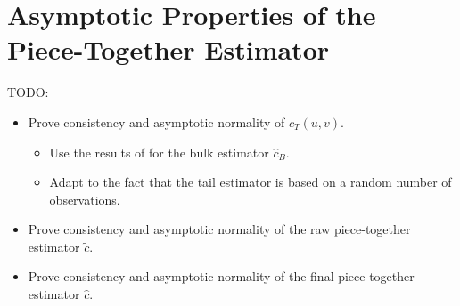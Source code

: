 \documentclass[12pt, headinclude=true]{scrartcl}
\begin{document}
\section{Asymptotic
Properties of the Piece-Together Estimator}
TODO:
\begin{itemize}
  \item Prove consistency and asymptotic normality of $\hat c_T(u,v)$.
    \begin{itemize}
      \item Use the results of \citet{geenens2017probit} for the bulk estimator $\hat c_B$.
      \item Adapt to the fact that the tail estimator is based on a random number of observations.
    \end{itemize}
  \item Prove consistency and asymptotic normality of the raw piece-together estimator $\tilde c$.
  \item Prove consistency and asymptotic normality of the final piece-together estimator $\hat c$.
\end{itemize}





\end{document}
